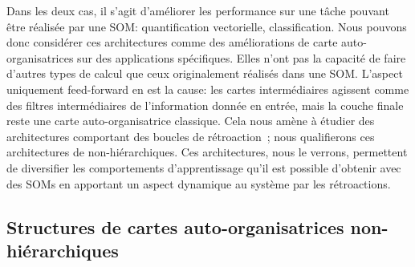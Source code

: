 \documentclass[../main]{subfiles}
\begin{document}
Dans les deux cas, il s'agit d'améliorer les performance sur une tâche pouvant être réalisée par une SOM: quantification vectorielle, classification.
Nous pouvons donc considérer ces architectures comme des améliorations de carte auto-organisatrices sur des applications spécifiques.
Elles n'ont pas la capacité de faire d'autres types de calcul que ceux originalement réalisés dans une SOM.
L'aspect uniquement feed-forward en est la cause: les cartes intermédiaires agissent comme des filtres intermédiaires de l'information donnée en entrée, mais la couche finale reste une carte auto-organisatrice classique.
Cela nous amène à étudier des architectures comportant des boucles de rétroaction~; nous qualifierons ces architectures de non-hiérarchiques. Ces architectures, nous le verrons, permettent de diversifier les comportements d'apprentissage qu'il est possible d'obtenir avec des SOMs en apportant un aspect dynamique au système par les rétroactions.



\subsection{Structures de cartes auto-organisatrices non-hiérarchiques}
\end{document}
